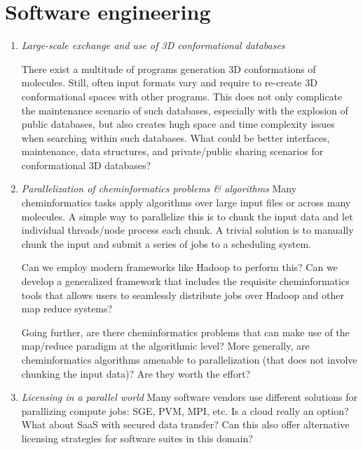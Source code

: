 \documentclass{sig-alternate}
\begin{document}
\section*{Software engineering}
\begin{enumerate}
\item \emph{Large-scale exchange and use of 3D conformational databases}

  There exist a multitude of programs generation 3D conformations of
  molecules. Still, often input formats vary and require to re-create
  3D conformational spaces with other programs. This does not only
  complicate the maintenance scenario of such databases, especially
  with the explosion of public databases, but also creates hugh space
  and time complexity issues when searching within such
  databases. What could be better interfaces, maintenance, data
  structures, and private/public sharing scenarios for conformational
  3D databases? 

\item \emph{Parallelization of cheminformatics problems \& algorithms}
Many cheminformatics tasks apply algorithms over large input files or
across many molecules. A simple way to parallelize this is to chunk
the input data and let individual threads/node process each chunk. A
trivial solution is to manually chunk the input and submit a series of
jobs to a scheduling system.

Can we employ modern frameworks like Hadoop to perform this? Can we
develop a generalized framework that includes the requisite
cheminformatics tools that allows users to seamlessly distribute jobs
over Hadoop and other map reduce systems?

Going further, are there cheminformatics problems that can make use of
the map/reduce paradigm at the algorithmic level? More generally, are
cheminformatics algorithms amenable to parallelization (that does not
involve chunking the input data)? Are they worth the effort?

\item \emph{Licensing in a parallel world} Many software vendors use
  different solutions for parallizing compute jobs: SGE, PVM, MPI,
  etc.  Is a cloud really an option?  What about SaaS with secured data
  transfer?  Can this also offer alternative licensing strategies for
  software suites in this domain?

\end{enumerate}
\end{document}
